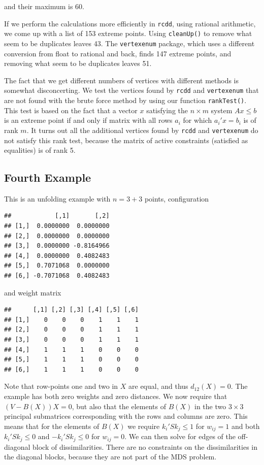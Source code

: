 \documentclass[
  12pt,
]{book}
\theoremstyle{definition}
\theoremstyle{definition}
\theoremstyle{definition}
\theoremstyle{definition}
\theoremstyle{remark}
\begin{document}
and their maximum is 60.

If we perform the calculations more efficiently in \texttt{rcdd}, using rational arithmetic, we come up with a list of 153 extreme points. Using \texttt{cleanUp()} to remove what seem to be duplicates leaves 43.
The \texttt{vertexenum} package, which uses a different conversion from float to rational and back, finds 147 extreme points, and removing what seem to be duplicates leaves 51.

The fact that we get different numbers of vertices with different methods is somewhat disconcerting. We test the vertices found by \texttt{rcdd} and \texttt{vertexenum} that are not found with the brute force method by using our function \texttt{rankTest()}. This test is based on the fact that a vector \(x\)
satisfying the \(n\times m\) system \(Ax\leq b\) is an extreme point if and only if matrix with all rows \(a_i\) for which \(a_i'x=b_i\) is of
rank \(m\). It turns out all the additional vertices found by \texttt{rcdd} and \texttt{vertexenum} do not satisfy this rank test, because the matrix of active constraints (satisfied as equalities) is of rank 5.

\hypertarget{fourth-example}{%
\subsection{Fourth Example}\label{fourth-example}}

This is an unfolding example with \(n=3+3\) points, configuration

\begin{verbatim}
##            [,1]       [,2]
## [1,]  0.0000000  0.0000000
## [2,]  0.0000000  0.0000000
## [3,]  0.0000000 -0.8164966
## [4,]  0.0000000  0.4082483
## [5,]  0.7071068  0.0000000
## [6,] -0.7071068  0.4082483
\end{verbatim}

and weight matrix

\begin{verbatim}
##      [,1] [,2] [,3] [,4] [,5] [,6]
## [1,]    0    0    0    1    1    1
## [2,]    0    0    0    1    1    1
## [3,]    0    0    0    1    1    1
## [4,]    1    1    1    0    0    0
## [5,]    1    1    1    0    0    0
## [6,]    1    1    1    0    0    0
\end{verbatim}

Note that row-points one and two in \(X\) are equal, and thus \(d_{12}(X)=0\). The example has both zero weights and zero distances. We now require that \((V-B(X))X=0\), but also that the elements of \(B(X)\) in the two \(3\times 3\) principal submatrices corresponding with the rows and columns are zero. This means that for the elements of \(B(X)\) we require \(k_i'Sk_j\leq 1\) for \(w_{ij}=1\) and both \(k_i'Sk_j\leq 0\) and \(-k_i'Sk_j\leq 0\) for \(w_{ij}=0\). We can then solve for edges of the off-diagonal block of dissimilarities. There are no constraints on the dissimilarities in the
diagonal blocks, because they are not part of the MDS problem.
\end{document}
